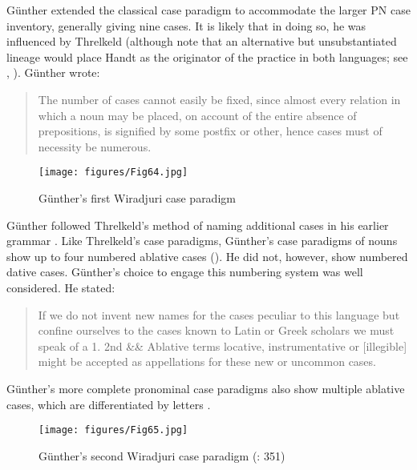 Günther extended the classical case paradigm to accommodate the larger PN case inventory, generally giving nine cases. It is likely that in doing so, he was influenced by Threlkeld (although note that an alternative but unsubstantiated lineage would place Handt as the originator of the practice in both languages; see , ). Günther wrote:

\begin{quote}
    The number of cases cannot easily be fixed, since almost every relation in which a noun may be placed, on account of the entire absence of prepositions, is signified by some postfix or other, hence cases must of necessity be numerous. \citep[345]{gunther_lecture_1840}
\end{quote} 


\begin{figure}[b]
\texttt{[image: figures/Fig64.jpg]}
\caption{Günther’s first Wiradjuri case paradigm \citep[54]{gunther_native_1838}}
\label{fig:4:64}
\end{figure}

Günther followed Threlkeld’s method of naming additional cases in his earlier grammar \citep[55]{gunther_native_1838}. Like Threlkeld’s case paradigms, Günther’s case paradigms of nouns \citeyearpar[49--56]{gunther_native_1838} show up to four numbered ablative cases (). He did not, however, show numbered dative cases. Günther’s choice to engage this numbering system was well considered. He stated: 


\begin{quote}
    If we do not invent new names for the cases peculiar to this language but confine ourselves to the cases known to Latin or Greek scholars we must speak of a 1. 2nd \&\& Ablative terms locative, instrumentative or [illegible] might be accepted as appellations for these new or uncommon cases. \citep[48]{gunther_native_1838}
\end{quote}


Günther’s more complete pronominal case paradigms also show multiple ablative cases, which are differentiated by letters \citeyearpar[15--17]{gunther_native_1838}.

\begin{figure}[b]
\texttt{[image: figures/Fig65.jpg]}
\caption{Günther’s second Wiradjuri case paradigm (\citeyear{gunther_lecture_1840}: 351)}
\label{fig:4:65}
\end{figure}


